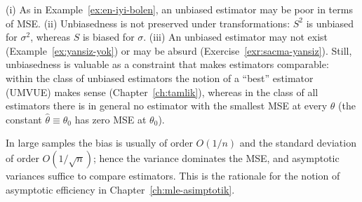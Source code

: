 \documentclass[main.tex]{subfiles}
\begin{document}
\begin{remark}
(i) As in Example~\ref{ex:en-iyi-bolen}, an unbiased estimator may be poor in terms of MSE. (ii) Unbiasedness is not preserved under transformations: $S^2$ is unbiased for $\sigma^2$, whereas $S$ is biased for $\sigma$. (iii) An unbiased estimator may not exist (Example~\ref{ex:yansiz-yok}) or may be absurd (Exercise~\ref{exr:sacma-yansiz}). Still, unbiasedness is valuable as a constraint that makes estimators comparable: within the class of unbiased estimators the notion of a ``best'' estimator (UMVUE) makes sense (Chapter~\ref{ch:tamlik}), whereas in the class of all estimators there is in general no estimator with the smallest MSE at every $\theta$ (the constant $\hat\theta\equiv\theta_0$ has zero MSE at $\theta_0$).
\end{remark}

\begin{remark}
In large samples the bias is usually of order $O(1/n)$ and the standard deviation of order $O(1/\sqrt n)$; hence the variance dominates the MSE, and asymptotic variances suffice to compare estimators. This is the rationale for the notion of asymptotic efficiency in Chapter~\ref{ch:mle-asimptotik}.
\end{remark}

\end{document}
